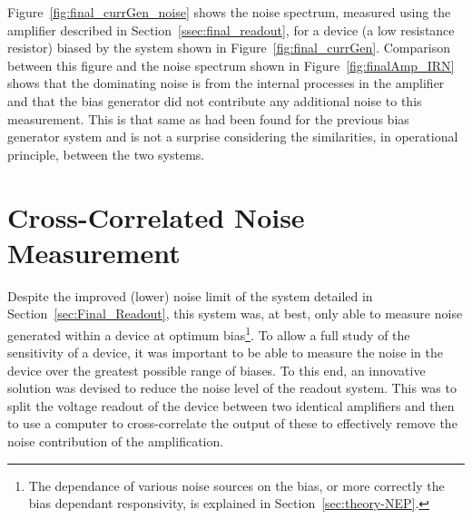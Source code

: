 \par
Figure~\ref{fig:final_currGen_noise} shows the noise spectrum, measured using the amplifier described in Section~\ref{ssec:final_readout}, for a device (a low resistance resistor) biased by the system shown in Figure~\ref{fig:final_currGen}. Comparison between this figure and the noise spectrum shown in Figure~\ref{fig:finalAmp_IRN} shows that the dominating noise is from the internal processes in the amplifier and that the bias generator did not contribute any additional noise to this measurement. This is that same as had been found for the previous bias generator system and is not a surprise considering the similarities, in operational principle, between the two systems.

\section{Cross-Correlated Noise Measurement}\label{sec:cross_col_noise}
Despite the improved (lower) noise limit of the system detailed in Section~\ref{sec:Final_Readout}, this system was, at best, only able to measure noise generated within a device at optimum bias\footnote{The dependance of various noise sources on the bias, or more correctly the bias dependant responsivity, is explained in Section~\ref{sec:theory-NEP}.}. To allow a full study of the sensitivity of a device, it was important to be able to measure the noise in the device over the greatest possible range of biases. To this end, an innovative solution was devised to reduce the noise level of the readout system. This was to split the voltage readout of the device between two identical amplifiers and then to use a computer to cross-correlate the output of these to effectively remove the noise contribution of the amplification.

